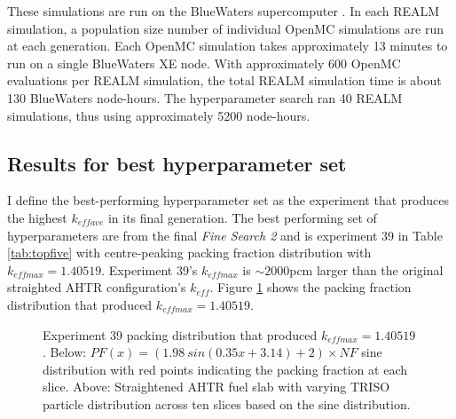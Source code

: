 These simulations are run on the BlueWaters supercomputer \cite{ncsa_about_2017}. 
In each \gls{REALM} simulation, a population size number of individual OpenMC 
simulations are run at each generation. 
Each OpenMC simulation takes approximately 13 minutes to run on a single BlueWaters 
XE node. 
With approximately 600 OpenMC evaluations per \gls{REALM} simulation, the total 
\gls{REALM} simulation time is about 130 BlueWaters node-hours. 
The hyperparameter search ran 40 REALM simulations, thus using approximately
5200 node-hours.

\subsection{Results for best hyperparameter set}
I define the best-performing hyperparameter set as the experiment that produces 
the highest $k_{eff ave}$ in its final generation. 
The best performing set of hyperparameters are from the final 
\textit{Fine Search 2} and is experiment 39 in Table \ref{tab:topfive}
with centre-peaking packing fraction distribution with $k_{eff max} = 1.40519$. 
Experiment 39's $k_{eff max}$ is $\sim2000$pcm larger than the original 
straighted \gls{AHTR} configuration's $k_{eff}$. 
Figure \ref{fig:triso_distribution_sine_39} shows the packing fraction distribution 
that produced $k_{eff max} = 1.40519$. 
\begin{figure}[]
    \centering
    \caption{Experiment 39 packing distribution that produced $k_{eff max} = 1.40519$. 
    Below: $PF(x) = (1.98\ sin(0.35x+3.14)+2)  \times NF$ sine distribution with 
    red points indicating the packing fraction at each slice. 
    Above: Straightened \acrlong{AHTR} fuel slab with varying \gls{TRISO} particle 
    distribution across ten slices based on the sine distribution. }
    \label{fig:triso_distribution_sine_39}
\end{figure}

